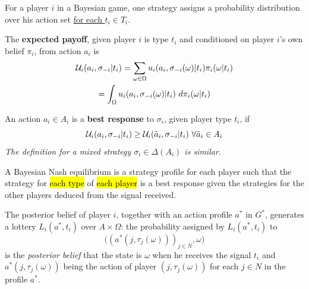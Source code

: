\documentclass[11pt]{article}
\begin{document}
			\begin{remark}[Interpretation]
				For a player $i$ in a Bayesian game, one strategy assigns a probability distribution over his action set \ul{for each $t_i \in T_i$}.
			\end{remark}
			
			\begin{definition}
				The \textbf{expected payoff}, given player $i$ is type $t_i$ and conditioned on player $i$'s own belief $\pi_i$, from action $a_i$ is 
				\begin{gather}
					\mc{U}_i(a_i, \sigma_{-i}| t_i) 
					= \sum_{\omega \in \Omega} u_i(a_i, \sigma_{-i}(\omega)|t_i)\pi_i(\omega|t_i) \\
					= \int_{\Omega} u_i(a_i, \sigma_{-i}(\omega)|t_i)\ d\pi_i(\omega|t_i)
				\end{gather}
			\end{definition}
			
			\begin{definition}
				An action $a_i \in A_i$ is a \textbf{best response} to $\sigma_i$, given player type $t_i$, if
				\begin{equation}
					\mathcal{{U}}_i(a_i, \sigma_{-i}|t_i) \geq \mathcal{{U}}_i(\tilde{a}_i, \sigma_{-i}|t_i)\ \forall \tilde{a}_i \in A_i
				\end{equation}
				\emph{The definition for a mixed strategy $\sigma_i \in \Delta(A_i)$ is similar}.
			\end{definition}
			
			\begin{definition}
				A Bayesian Nash equilibrium is a strategy profile for each player such that the strategy for \hl{each type} of \hl{each player} is a best response given the strategies for the other players deduced from the signal received.
			\end{definition}
			
			\begin{definition}
				The posterior belief of player $i$, together with an action profile $a^*$ in $G^*$, generates a lottery $L_i(a^*, t_i)$ over $A \times \Omega$: the probability assigned by $L_i(a^*, t_i)$ to 
				\begin{equation}
					\Big((a^*(j, \tau_j(\omega)))_{j\in N}, \omega \Big)
				\end{equation}
				is the \emph{posterior belief} that the state is $\omega$ when he receives the signal $t_i$ and $a^*(j, \tau_j(\omega))$ being the action of player $(j, \tau_j(\omega))$ for each $j \in N$ in the profile $a^*$.
			\end{definition}
			
\end{document}
